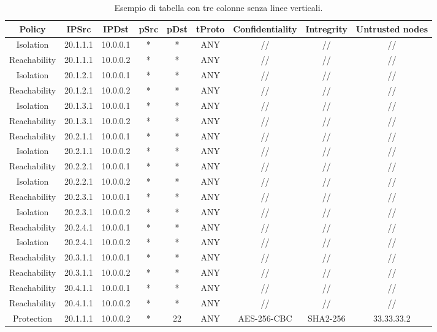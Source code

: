 \begin{table}
    \centering
    \small
    \begin{tabular}{ccccccccc}
        \hline
         Policy & IPSrc & IPDst & pSrc & pDst & tProto & Confidentiality & Intregrity & Untrusted nodes\\
        \hline
        Isolation & 20.1.1.1 & 10.0.0.1 & * & * & ANY & // & // & // \\
        Reachability & 20.1.1.1 & 10.0.0.2 & * & * & ANY & // & // & // \\
        Isolation & 20.1.2.1 & 10.0.0.1 & * & * & ANY & // & // & // \\
        Reachability & 20.1.2.1 & 10.0.0.2 & * & * & ANY & // & // & // \\
        Isolation & 20.1.3.1 & 10.0.0.1 & * & * & ANY & // & // & // \\
        Reachability & 20.1.3.1 & 10.0.0.2 & * & * & ANY & // & // & // \\
        Reachability & 20.2.1.1 & 10.0.0.1 & * & * & ANY & // & // & // \\
        Isolation & 20.2.1.1 & 10.0.0.2 & * & * & ANY & // & // & // \\
        Reachability & 20.2.2.1 & 10.0.0.1 & * & * & ANY & // & // & // \\
        Isolation & 20.2.2.1 & 10.0.0.2 & * & * & ANY & // & // & // \\
        Reachability & 20.2.3.1 & 10.0.0.1 & * & * & ANY & // & // & // \\
        Isolation & 20.2.3.1 & 10.0.0.2 & * & * & ANY & // & // & // \\
        Reachability & 20.2.4.1 & 10.0.0.1 & * & * & ANY & // & // & // \\
        Isolation & 20.2.4.1 & 10.0.0.2 & * & * & ANY & // & // & // \\
        Reachability & 20.3.1.1 & 10.0.0.1 & * & * & ANY & // & // & // \\
        Reachability & 20.3.1.1 & 10.0.0.2 & * & * & ANY & // & // & // \\
        Reachability & 20.4.1.1 & 10.0.0.1 & * & * & ANY & // & // & // \\
        Reachability & 20.4.1.1 & 10.0.0.2 & * & * & ANY & // & // & // \\
        Protection & 20.1.1.1 & 10.0.0.2 & * & 22 & ANY & AES-256-CBC & SHA2-256 & 33.33.33.2 \\
        \hline
    \end{tabular}
    \caption{Esempio di tabella con tre colonne senza linee verticali.}
    \label{tab:tabella}
\end{table}


